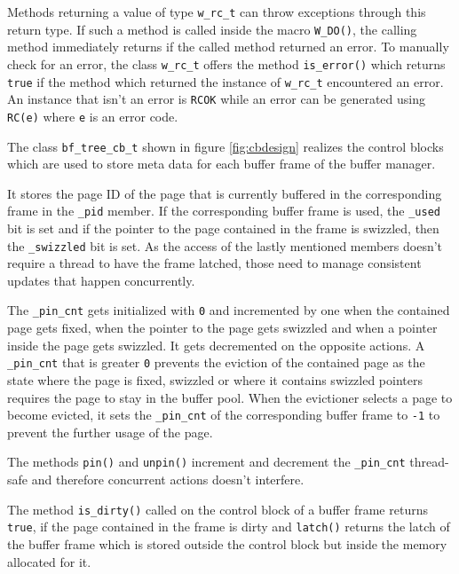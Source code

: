 	Methods returning a value of type \lstinline{w_rc_t} can throw exceptions through this return type. If such a method is called inside the macro \lstinline{W_DO()}, the calling method immediately returns if the called method returned an error. To manually check for an error, the class \lstinline{w_rc_t} offers the method \lstinline{is_error()} which returns \lstinline{true} if the method which returned the instance of \lstinline{w_rc_t} encountered an error. An instance that isn't an error is \lstinline{RCOK} while an error can be generated using \lstinline{RC(e)} where \lstinline{e} is an error code. 

	The class \lstinline{bf_tree_cb_t} shown in figure \ref{fig:cbdesign} realizes the control blocks which are used to store meta data for each buffer frame of the buffer manager.

	It stores the page ID of the page that is currently buffered in the corresponding frame in the \lstinline{_pid} member. If the corresponding buffer frame is used, the \lstinline{_used} bit is set and if the pointer to the page contained in the frame is swizzled, then the \lstinline{_swizzled} bit is set. As the access of the lastly mentioned members doesn't require a thread to have the frame latched, those need to manage consistent updates that happen concurrently.

	The \lstinline{_pin_cnt} gets initialized with \lstinline{0} and incremented by one when the contained page gets fixed, when the pointer to the page gets swizzled and when a pointer inside the page gets swizzled. It gets decremented on the opposite actions. A \lstinline{_pin_cnt} that is greater \lstinline{0} prevents the eviction of the contained page as the state where the page is fixed, swizzled or where it contains swizzled pointers requires the page to stay in the buffer pool. When the evictioner selects a page to become evicted, it sets the \lstinline{_pin_cnt} of the corresponding buffer frame to \lstinline{-1} to prevent the further usage of the page.

	The methods \lstinline{pin()} and \lstinline{unpin()} increment and decrement the \lstinline{_pin_cnt} thread-safe and therefore concurrent actions doesn't interfere.

	The method \lstinline{is_dirty()} called on the control block of a buffer frame returns \lstinline{true}, if the page contained in the frame is dirty and \lstinline{latch()} returns the latch of the  buffer frame which is stored outside the control block but inside the memory allocated for it.

